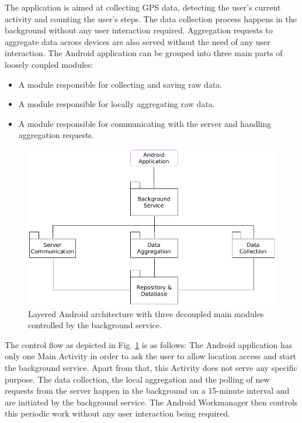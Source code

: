 \begin{samepage}
The application is aimed at collecting GPS data, detecting the user's current activity and counting the user's steps. The data collection process happens in the background without any user interaction required. Aggregation requests to aggregate data across devices are also served without the need of any user interaction.
The Android application can be grouped into three main parts of loosely coupled modules:
\begin{itemize}
	\item A module responsible for collecting and saving raw data.
	\item A module responsible for locally aggregating raw data.
	\item A module responsible for communicating with the server and handling aggregation requests.
\end{itemize}
\end{samepage}

\begin{figure}[h!]
  \includegraphics[width=\textwidth]{data/diagrams/android-architecture.png}
  \caption{Layered Android architecture with three decoupled main modules controlled by the background service.}
  \label{android-overview}
\end{figure}

The control flow as depicted in Fig. \ref{android-overview} is as follows: 
The Android application has only one Main Activity in order to ask the user to allow location access and start the background service. Apart from that, this Activity does not serve any specific purpose. 
The data collection, the local aggregation and the polling of new requests from the server happen in the background on a 15-minute interval and are initiated by the background service. The Android Workmanager then controls this periodic work without any user interaction being required.

